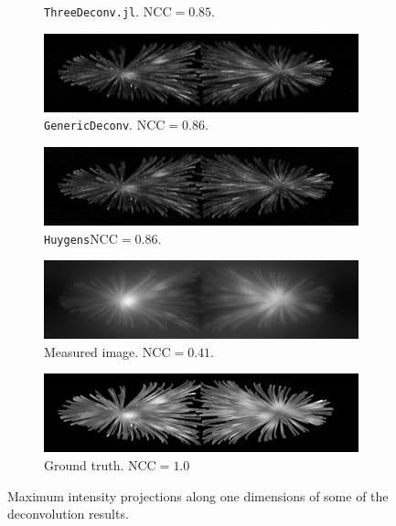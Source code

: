 \documentclass{juliacon}
\begin{document}
\begin{figure}[h]
\begin{subfigure}{.3\textwidth}
                \caption{\texttt{ThreeDeconv.jl}. $\text{NCC}= 0.85$.}
            \end{subfigure}
            \begin{subfigure}{.3\textwidth}
                \centering
                \includegraphics[width=\textwidth]{figures/MIPs/mip_GenericDeconv.png}
                \caption{\texttt{GenericDeconv}. $\text{NCC}= 0.86$.}
            \end{subfigure}
            \begin{subfigure}{.3\textwidth}
                \centering
                \includegraphics[width=\textwidth]{figures/MIPs/mip_Huygens.png}
                \caption{\texttt{Huygens}$\text{NCC}= 0.86$.}
            \end{subfigure}
            \begin{subfigure}{.3\textwidth}
                \centering
                \includegraphics[width=\textwidth]{figures/MIPs/mip_raw.png}
                \caption{Measured image. $\text{NCC}= 0.41$.}
            \end{subfigure}
            \begin{subfigure}{.3\textwidth}
                \centering
                \includegraphics[width=\textwidth]{figures/MIPs/mip_ground_truth.png}
                \caption{Ground truth. $\text{NCC}= 1.0$}
            \end{subfigure}
            \caption{Maximum intensity projections along one dimensions of some of the deconvolution results.}
            \label{img:results}
        \end{figure} 
\end{document}

